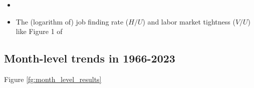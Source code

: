 \documentclass[12pt]{article}
\begin{document}
\begin{itemize}
    \item 
    \item The (logarithm of) job finding rate ($H/U$) and labor market tightness ($V/U$) like Figure 1 of \cite{borowczyk2013accounting}
    
\end{itemize}

\subsection{Month-level trends in 1966-2023}

Figure \ref{fg:month_level_results}

\begin{figure}[!ht]
  \begin{center}
  \\
\end{center}
\end{figure}
\end{document}

